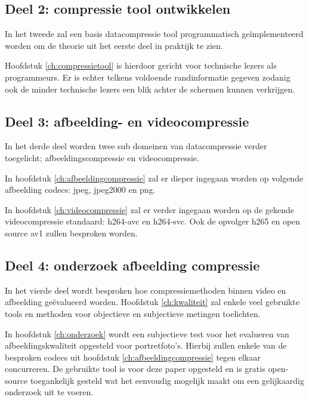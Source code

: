 \subsection{Deel 2: compressie tool ontwikkelen}
\label{sec:opzet-bachelorproef-deel-2}
 
 In het tweede zal een basis \gls{datacompressie} tool programmatisch geïmplementeerd worden om de theorie uit het eerste deel in praktijk te zien.
 
Hoofdstuk \ref{ch:compressietool} is hierdoor gericht voor technische lezers als programmeurs. Er is echter telkens voldoende randinformatie gegeven zodanig ook de minder technische lezers een blik achter de schermen kunnen verkrijgen.

\subsection{Deel 3: afbeelding- en videocompressie}
\label{sec:opzet-bachelorproef-deel-3}

In het derde deel worden twee sub domeinen van \gls{datacompressie} verder toegelicht; \gls{afbeeldingscompressie} en \gls{videocompressie}. 

In hoofdstuk \ref{ch:afbeeldingcompressie} zal er dieper ingegaan worden op volgende afbeelding \glspl{codec}: \gls{jpeg}, \gls{jpeg2000} en \gls{png}. 

In hoofdstuk \ref{ch:videocompressie} zal er verder ingegaan worden op de gekende \gls{videocompressie} standaard: \gls{h264-avc} en \gls{h264-svc}. Ook de opvolger \gls{h265} en open source \gls{av1} zullen besproken worden.

\subsection{Deel 4: onderzoek afbeelding compressie}
\label{sec:opzet-bachelorproef-deel-4}

In het vierde deel wordt besproken hoe compressiemethoden binnen video en afbeelding geëvalueerd worden. Hoofdstuk \ref{ch:kwaliteit} zal enkele veel gebruikte tools en methoden voor objectieve en subjectieve metingen toelichten.

In hoofdstuk \ref{ch:onderzoek} wordt een subjectieve test voor het evalueren van afbeeldingskwaliteit opgesteld voor portretfoto's. Hierbij zullen enkele van de besproken  \glspl{codec} uit hoofdstuk \ref{ch:afbeeldingcompressie} tegen elkaar concurreren. De gebruikte tool is voor deze paper opgesteld en is gratis \gls{open-source} toegankelijk gesteld wat het eenvoudig mogelijk maakt om een gelijkaardig onderzoek uit te voeren.

